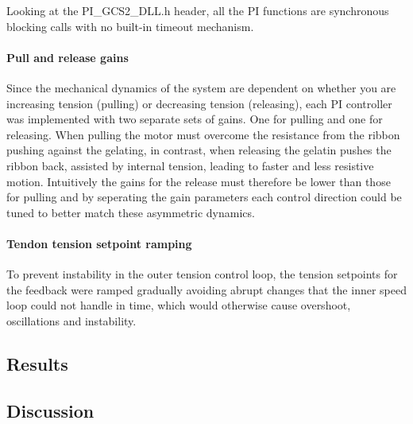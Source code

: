 Looking at the PI_GCS2_DLL.h header, all the PI functions are synchronous blocking calls with no built-in timeout mechanism.

\paragraph*{Pull and release gains}
Since the mechanical dynamics of the system are dependent on whether you are increasing tension (pulling) or decreasing tension (releasing), each PI controller was implemented with two separate sets of gains. One for pulling and one for releasing. When pulling the motor must overcome the resistance from the ribbon pushing against the gelating, in contrast, when releasing the gelatin pushes the ribbon back, assisted by internal tension, leading to faster and less resistive motion. Intuitively the gains for the release must therefore be lower than those for pulling and by seperating the gain parameters each control direction could be tuned to better match these asymmetric dynamics.

\paragraph*{Tendon tension setpoint ramping}
To prevent instability in the outer tension control loop, the tension setpoints for the feedback were ramped gradually avoiding abrupt changes that the inner speed loop could not handle in time, which would otherwise cause overshoot, oscillations and instability.

\subsection{Results}

\subsection{Discussion}
